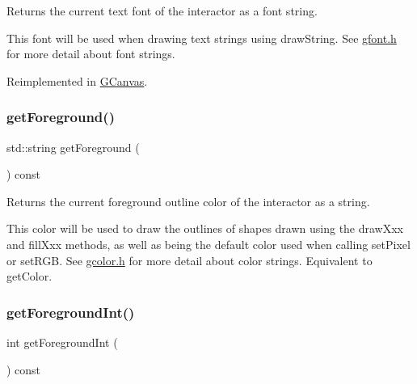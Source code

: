 Returns the current text font of the interactor as a font string. 

This font will be used when drawing text strings using draw\+String. See \mbox{\hyperlink{gfont_8h_source}{gfont.\+h}} for more detail about font strings. 

Reimplemented in \mbox{\hyperlink{classsgl_1_1GCanvas_aa0829769ac6325b5c58d27c8e363cb78}{G\+Canvas}}.

\mbox{\label{classsgl_1_1GDrawingSurface_a4fa2d8b0192a3a5b4af4bbfe71194d03}} 
\subsubsection{\texorpdfstring{get\+Foreground()}{getForeground()}}
{\footnotesize\ttfamily std\+::string get\+Foreground (\begin{DoxyParamCaption}{ }\end{DoxyParamCaption}) const\hspace{0.3cm}{\ttfamily [virtual]}}



Returns the current foreground outline color of the interactor as a string. 

This color will be used to draw the outlines of shapes drawn using the draw\+Xxx and fill\+Xxx methods, as well as being the default color used when calling set\+Pixel or set\+R\+GB. See \mbox{\hyperlink{gcolor_8h_source}{gcolor.\+h}} for more detail about color strings. Equivalent to get\+Color. \mbox{\label{classsgl_1_1GDrawingSurface_ac3b12ab385a6ef9ae90fc879860ba726}} 
\subsubsection{\texorpdfstring{get\+Foreground\+Int()}{getForegroundInt()}}
{\footnotesize\ttfamily int get\+Foreground\+Int (\begin{DoxyParamCaption}{ }\end{DoxyParamCaption}) const\hspace{0.3cm}{\ttfamily [virtual]}}



